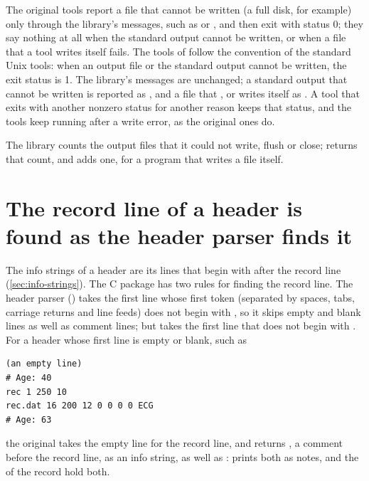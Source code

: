 The original tools report a file that cannot be written (a full disk, for
example) only through the library's messages, such as  or , and then exit with status 0; they say nothing at all when the
standard output cannot be written, or when a file that a tool writes itself
fails. The tools of \wfdbx{} follow the convention of the standard Unix
tools: when an output file or the standard output cannot be written, the
exit status is 1. The library's messages are unchanged; a standard output
that cannot be written is reported as , and a file that ,  or  writes
itself as . A tool that exits with
another nonzero status for another reason keeps that status, and the tools
keep running after a write error, as the original ones do.

The library counts the output files that it could not write, flush or close;
 returns that count, and
 adds one, for a program that writes a file
itself.

\section{The record line of a header is found as the header parser finds it}
\label{sec:record-line-divergence}

The info strings of a header are its lines that begin with \code{\#} after
the record line (\cref{sec:info-strings}). The C package has two rules for
finding the record line. The header parser () takes the
first line whose first token (separated by spaces, tabs, carriage returns
and line feeds) does not begin with \code{\#}, so it skips empty and blank
lines as well as comment lines; but  takes the first line that
does not begin with \code{\#}. For a header whose first line is empty or
blank, such as
\begin{lstlisting}[style=text]
(an empty line)
# Age: 40
rec 1 250 10
rec.dat 16 200 12 0 0 0 0 ECG
# Age: 63
\end{lstlisting}
the original  takes the empty line for the record line, and
returns , a comment before the record line, as an info string,
as well as :  prints both as notes, and the
 of the record hold both.

